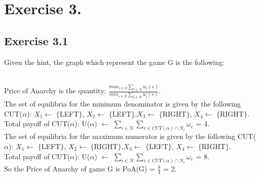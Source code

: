 \documentclass[11pt]{scrartcl}
\begin{document}
\newpage
\section{Exercise 3.}
\subsection{Exercise 3.1}
Given the hint, the graph which represent the game G is the following:\\
\\
Price of Anarchy is the quantity: $\frac{max_{s \in S} \sum_{i\in N} u_i(s)}{min_{s \in E} \sum_{i\in N} u_i(s)}$.\\
The set of equilibria for the minimum denominator is given by the following CUT($\alpha$): $X_1\gets$ $\{$LEFT$\}$, $X_2\gets$ $\{$LEFT$\}$,$X_3\gets$ $\{$RIGHT$\}$, $X_4\gets$ $\{$RIGHT$\}$.\\
Total payoff of CUT($\alpha$):  U($\alpha$) $\gets$ $\sum_{i \in N} $$\sum_{e \in CUT(\alpha)\cap N_i}{\omega_e}$ = 4.\\
The set of equilibria for the maximum numerator is given by the following CUT($\alpha$): $X_1\gets$ $\{$LEFT$\}$, $X_2\gets$ $\{$RIGHT$\}$,$X_3\gets$ $\{$LEFT$\}$, $X_4\gets$ $\{$RIGHT$\}$.\\
Total payoff of CUT($\alpha$):  U($\alpha$) $\gets$ $\sum_{i \in N} $$\sum_{e \in CUT(\alpha)\cap N_i}{\omega_e}$ = 8.\\
So the Price of Anarchy of game G is PoA(G) = $\frac{8}{4}$ = 2.
\end{document}
